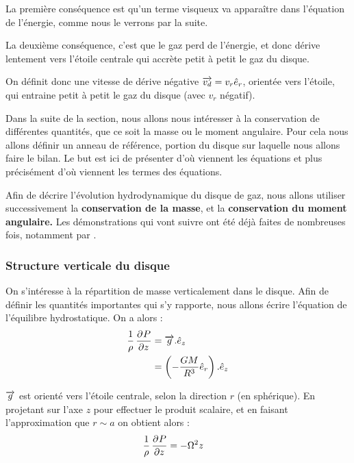 \bigskip

La première conséquence est qu'un terme visqueux va apparaître dans l'équation de l'énergie, comme nous le verrons par la suite. 

La deuxième conséquence, c'est que le gaz perd de l'énergie, et donc dérive lentement vers l'étoile centrale qui accrète petit à petit le gaz du disque. 

On définit donc une vitesse de dérive négative ${\overrightarrow{v_d}} = v_r \hat{e}_r$, orientée vers l'étoile, qui entraine petit à petit le gaz du disque (avec $v_r$ négatif).

Dans la suite de la section, nous allons nous intéresser à la conservation de différentes quantités, que ce soit la masse ou le moment angulaire. Pour cela nous allons définir un anneau de référence, portion du disque sur laquelle nous allons faire le bilan. Le but est ici de présenter d'où viennent les équations et plus précisément d'où viennent les termes des équations. 

\bigskip

Afin de décrire l'évolution hydrodynamique du disque de gaz, nous allons utiliser successivement la \textbf{conservation de la masse}, et la \textbf{conservation du moment angulaire.} Les démonstrations qui vont suivre ont été déjà faites de nombreuses fois, notamment par \citep{pringle1981accretion}. %

\subsubsection{Structure verticale du disque}
On s'intéresse à la répartition de masse verticalement dans le disque. Afin de définir les quantités importantes qui s'y rapporte, nous allons écrire l'équation de l'équilibre hydrostatique. On a alors :
\begin{align}
\frac{1}{\rho}\mathinner{ \dfrac{\partial{^{}}P}{\partial{{z}^{}}} } &= {\overrightarrow{g}}.\hat{e}_z\\
&= \left(-\frac{GM}{R^3}\hat{e}_r\right).\hat{e}_z
\end{align}

${\overrightarrow{g}}$ est orienté vers l'étoile centrale, selon la direction $r$ (en sphérique). En projetant sur l'axe $z$ pour effectuer le produit scalaire, et en faisant l'approximation que $r\sim a$ on obtient alors :
\begin{align}
\frac{1}{\rho}\mathinner{ \dfrac{\partial{^{}}P}{\partial{{z}^{}}} } &= -\Omega^2 z
\end{align}

